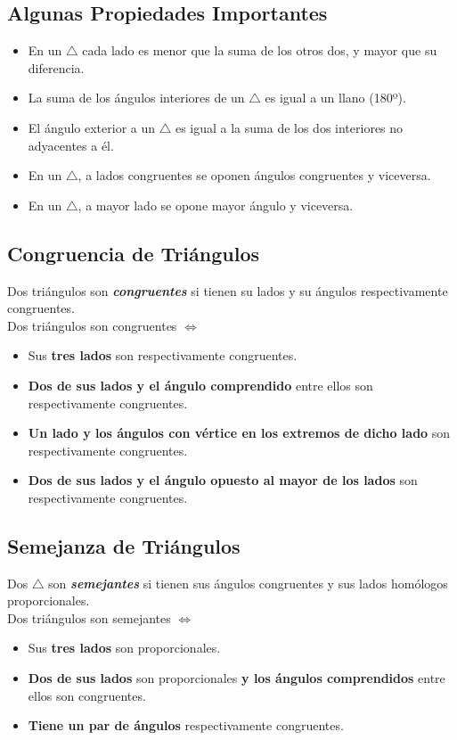 \documentclass[10pt]{article}
\begin{document}
\subsection{Algunas Propiedades Importantes}
\begin{itemize}
\item En un $\triangle$ cada lado es menor que la suma de los otros dos, y mayor que su diferencia.
\item La suma de los ángulos interiores de un $\triangle$ es igual a un llano (180º).
\item El ángulo exterior a un $\triangle$ es igual a la suma de los dos interiores no adyacentes a él.
\item En un $\triangle$, a lados congruentes se oponen ángulos congruentes y viceversa.
\item En un $\triangle$, a mayor lado se opone mayor ángulo y viceversa.
\end{itemize}
\subsection{Congruencia de Triángulos}
Dos triángulos son \textbf{\textit{congruentes}} si tienen su lados y su ángulos respectivamente congruentes.\\ Dos triángulos son congruentes $\iff$
\begin{itemize}
\item Sus \textbf{tres lados} son respectivamente congruentes.
\item \textbf{Dos de sus lados y el ángulo comprendido} entre ellos son respectivamente congruentes. 
\item \textbf{Un lado y los ángulos con vértice en los extremos de dicho lado} son respectivamente congruentes.
\item \textbf{Dos de sus lados y el ángulo opuesto al mayor de los lados} son respectivamente congruentes.
\end{itemize}
\subsection{Semejanza de Triángulos}
Dos $\triangle$ son \textbf{\textit{semejantes}} si tienen sus ángulos congruentes y sus lados homólogos proporcionales.\\
Dos triángulos son semejantes $\iff$
\begin{itemize}
\item Sus \textbf{tres lados} son proporcionales.
\item \textbf{Dos de sus lados} son proporcionales \textbf{y los ángulos comprendidos} entre ellos son congruentes.
\item \textbf{Tiene un par de ángulos} respectivamente congruentes.
\end{itemize}
\end{document}
